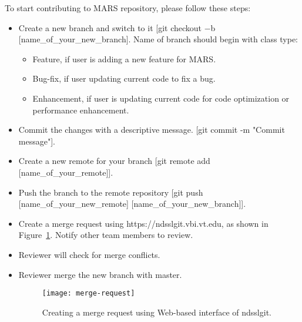 To start contributing to MARS repository, please follow these steps:
\begin{itemize}
\item Create a new branch and switch to it [git checkout $-$b [name\_of\_your\_new\_branch]. Name of branch should begin with class type:
\begin{itemize}
\item Feature, if user is adding a new feature for MARS.
\item Bug-fix, if user updating current code to fix a bug.
\item Enhancement, if user is updating current code for code optimization or performance enhancement.
\end{itemize} 

\item Commit the changes with a  descriptive message. [git commit -m "Commit message"]. 
\item Create a new remote for your branch [git remote add [name\_of\_your\_remote]].
\item Push the branch to the remote repository [git push [name\_of\_your\_new\_remote] [name\_of\_your\_new\_branch]].
\item Create a merge request using https://ndsslgit.vbi.vt.edu, as shown in Figure~\ref{fig:merge-request}. Notify other team members to review.
\item Reviewer will check for merge conflicts.
\item Reviewer merge the new branch with master.

\begin{figure}[H]
\centering
\texttt{[image: merge-request]}
\caption{
Creating a merge request using Web-based interface of ndsslgit.
}   %
\label{fig:merge-request}
\end{figure}

\end{itemize}



